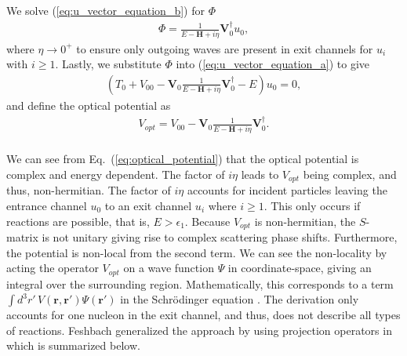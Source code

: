 \documentclass[preprintnumbers,floatfix,aps,prc,preprint,nofootinbib]{revtex4-1}
\begin{document}
%
We solve (\ref{eq:u_vector_equation_b}) for $\Phi$
%
\begin{eqnarray}
	\label{eq:phi}
	\Phi = \frac{1}{E - \textbf{H} + i \eta} \textbf{V}_0^{\dagger} u_0,
\end{eqnarray}
%
where $\eta \rightarrow 0^+$ to ensure only outgoing waves are present in exit channels for $u_i$ with $i \geq 1$. Lastly, we substitute $\Phi$ into (\ref{eq:u_vector_equation_a}) to give
%
\begin{eqnarray}
	\label{eq:u0_equation}
	(T_0 + V_{00}  - \textbf{V}_0 \frac{1}{E-\textbf{H}+i\eta} \textbf{V}_0^{\dagger} - E) u_0 = 0,
\end{eqnarray}
%
and define the optical potential as
%
\begin{eqnarray}
	\label{eq:optical_potential}
	V_{opt} = V_{00}  - \textbf{V}_0 \frac{1}{E-\textbf{H}+i\eta} \textbf{V}_0^{\dagger}.
\end{eqnarray}
%
\\

We can see from Eq.~(\ref{eq:optical_potential}) that the optical potential is complex and energy dependent. The factor of $i \eta$ leads to $V_{opt}$ being complex, and thus, non-hermitian. The factor of $i \eta$ accounts for incident particles leaving the entrance channel $u_0$ to an exit channel $u_i$ where $i \geq 1$. This only occurs if reactions are possible, that is, $E > \epsilon_1$. Because $V_{opt}$ is non-hermitian, the $S$-matrix is not unitary giving rise to complex scattering phase shifts. Furthermore, the potential is non-local from the second term. We can see the non-locality by acting the operator $V_{opt}$ on a wave function $\Psi$ in coordinate-space, giving an integral over the surrounding region. Mathematically, this corresponds to a term $\int d^3 r' \, V(\textbf{r}, \textbf{r}') \Psi(\textbf{r}')$ in the Schr\"odinger equation \cite{Hodgson:1971ab}. The derivation only accounts for one nucleon in the exit channel, and thus, does not describe all types of reactions. Feshbach generalized the approach by using projection operators in \cite{Feshbach:1962ut} which is summarized below.
\\
\end{document}
